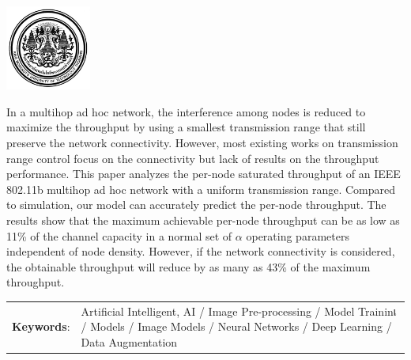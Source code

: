 \documentclass[12pt,oneside,openright,a4paper]{cpe-thai-project}
\begin{document}
\pdfstringdefDisableCommands{%
\let\MakeUppercase\relax
}

\begin{center}
  \includegraphics[width=2.8cm]{logo02.jpg}
\end{center}
\vspace*{-1cm}

\maketitlepage
\makesignaturepage 

\abstract

In a multihop ad hoc network, the interference among nodes is
  reduced to maximize the throughput by using a smallest transmission
  range that still preserve the network connectivity. However, most
  existing works on transmission range control focus on the
  connectivity but lack of results on the throughput performance. This
  paper analyzes the per-node saturated throughput of an IEEE 802.11b
  multihop ad hoc network with a uniform transmission range. Compared
  to simulation, our model can accurately predict the per-node
  throughput.  The results show that the maximum achievable per-node
  throughput can be as low as 11\% of the channel capacity in a normal
  set of $\alpha$ operating parameters independent of node density. However, if
  the network connectivity is considered, the obtainable throughput
  will reduce by as many as 43\% of the maximum throughput. 

\begin{flushleft}
\begin{tabular*}{\textwidth}{@{}lp{}}
\textbf{Keywords}: & Artificial Intelligent, AI  / Image Pre-processing / Model Traininเ  / Models / Image Models / Neural Networks / Deep Learning / Data Augmentation
\end{tabular*}
\end{flushleft}
\endabstract

\thaiabstract
\end{document}
